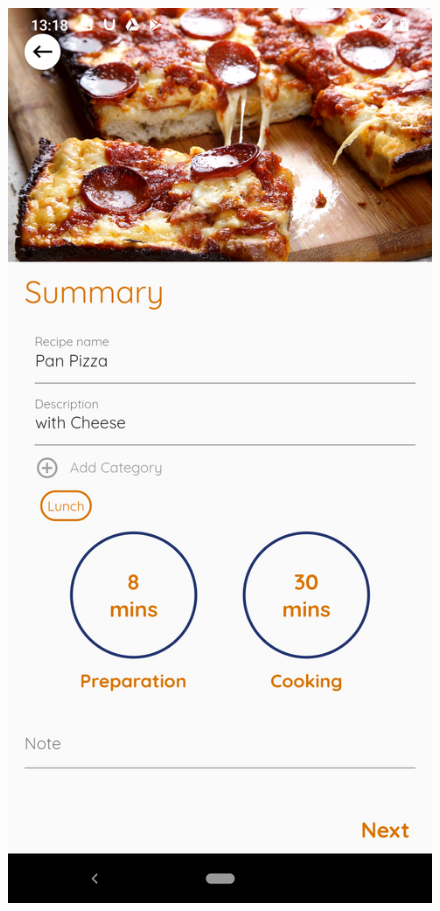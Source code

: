 \documentclass{article}
\begin{document}
\begin{figure}[h!]
        \includegraphics[scale=0.1]{Images/Panpizza_order.jpg}

\end{figure}
\end{document}
